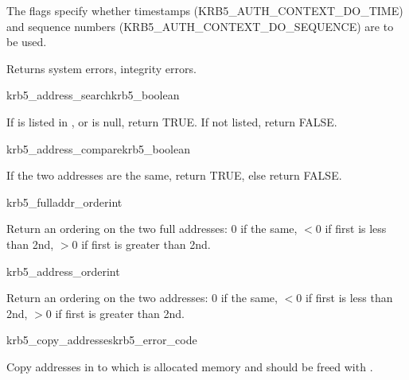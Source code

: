The  flags specify whether timestamps
(KRB5_AUTH_CONTEXT_DO_TIME) and sequence numbers
(KRB5_AUTH_CONTEXT_DO_SEQUENCE) are to be used.

Returns system errors, integrity errors.

\begin{funcdecl}{krb5_address_search}{krb5_boolean}{\funcinout}
\funcin
{}
\end{funcdecl}

If  is listed in , or
 is null, return TRUE.  If not listed, return FALSE.

\begin{funcdecl}{krb5_address_compare}{krb5_boolean}{\funcinout}
\funcin
{}
\end{funcdecl}

If the two addresses are the same, return TRUE, else return FALSE.

\begin{funcdecl}{krb5_fulladdr_order}{int}{\funcinout}
\funcin
{}
\end{funcdecl}

Return an ordering on the two full addresses:  0 if the same,
$< 0$ if first is less than 2nd, $> 0$ if first is greater than 2nd.

\begin{funcdecl}{krb5_address_order}{int}{\funcinout}
\funcin
{}
\end{funcdecl}

Return an ordering on the two addresses:  0 if the same,
$< 0$ if first is less than 2nd, $> 0$ if first is greater than 2nd.

\begin{funcdecl}{krb5_copy_addresses}{krb5_error_code}{\funcinout}
\funcin
{}
\funcout
{}
\end{funcdecl}

Copy addresses in  to  which is
allocated memory and should be freed with .

